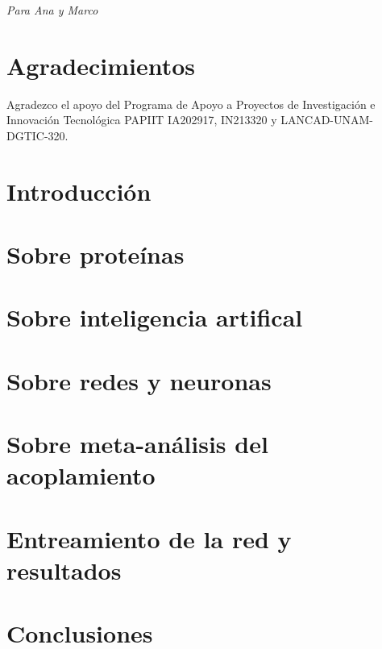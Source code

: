 \documentclass{book}
\begin{document}
\thispagestyle{empty}
\frontmatter
    
    \clearpage
    \mbox{}
    \clearpage
    \thispagestyle{empty}

    \begin{flushright}
      \textit{Para Ana y Marco}
    \end{flushright}

   \chapter*{Agradecimientos}
   Agradezco el apoyo del Programa de Apoyo a Proyectos de
   Investigación e Innovación Tecnológica PAPIIT IA202917, IN213320 y
   LANCAD-UNAM-DGTIC-320.

   \tableofcontents

\mainmatter
    \chapter*{Introducción}
        
    \chapter{Sobre proteínas}
        
    \chapter{Sobre inteligencia artifical}
        
    \chapter{Sobre redes y neuronas}
        
    \chapter{Sobre meta-análisis del acoplamiento}
        
    \chapter{Entreamiento de la red y resultados}
        
    \chapter{Conclusiones}
        


\backmatter
    \nocite{*}
    \printbibliography
\end{document}
